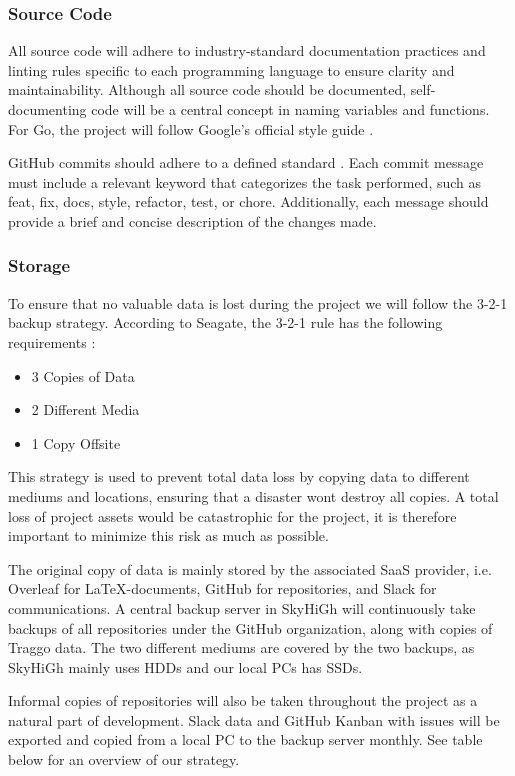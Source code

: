\subsubsection{Source Code}  
All source code will adhere to industry-standard documentation practices and linting rules specific to each programming language to ensure clarity and maintainability. Although all source code should be documented, self-documenting code will be a central concept in naming variables and functions. For Go, the project will follow Google's official style guide \cite{google_go_style}. 

GitHub commits should adhere to a defined standard \cite{commit_standard}. Each commit message must include a relevant keyword that categorizes the task performed, such as feat, fix, docs, style, refactor, test, or chore. Additionally, each message should provide a brief and concise description of the changes made.

\subsubsection{Storage}

To ensure that no valuable data is lost during the project we will follow the 3-2-1 backup strategy. According to Seagate, the 3-2-1 rule has the following requirements \cite{3-2-1_data_storage}:

\begin{itemize}
    \item 3 Copies of Data
    \item 2 Different Media
    \item 1 Copy Offsite
\end{itemize}

This strategy is used to prevent total data loss by copying data to different mediums and locations, ensuring that a disaster wont destroy all copies. A total loss of project assets would be catastrophic for the project, it is therefore important to minimize this risk as much as possible. 

The original copy of data is mainly stored by the associated SaaS provider, i.e. Overleaf for \LaTeX-documents, GitHub for repositories, and Slack for communications. A central backup server in SkyHiGh will continuously take backups of all repositories under the GitHub organization, along with copies of Traggo data. The two different mediums are covered by the two backups, as SkyHiGh mainly uses HDDs and our local PCs has SSDs. 

Informal copies of repositories will also be taken throughout the project as a natural part of development. Slack data and GitHub Kanban with issues will be exported and copied from a local PC to the backup server monthly.
See table below for an overview of our strategy. 

